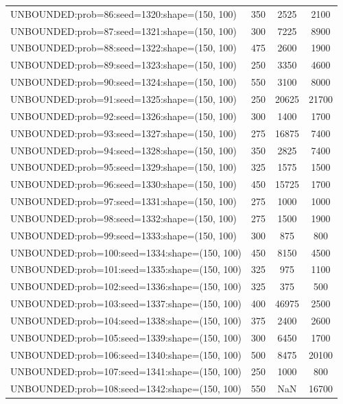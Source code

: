 \begin{longtable}{lccc}
UNBOUNDED:prob=86:seed=1320:shape=(150, 100)  &      350 &  2525 &   2100 \\
UNBOUNDED:prob=87:seed=1321:shape=(150, 100)  &      300 &  7225 &   8900 \\
UNBOUNDED:prob=88:seed=1322:shape=(150, 100)  &      475 &  2600 &   1900 \\
UNBOUNDED:prob=89:seed=1323:shape=(150, 100)  &      250 &  3350 &   4600 \\
UNBOUNDED:prob=90:seed=1324:shape=(150, 100)  &      550 &  3100 &   8000 \\
UNBOUNDED:prob=91:seed=1325:shape=(150, 100)  &      250 & 20625 &  21700 \\
UNBOUNDED:prob=92:seed=1326:shape=(150, 100)  &      300 &  1400 &   1700 \\
UNBOUNDED:prob=93:seed=1327:shape=(150, 100)  &      275 & 16875 &   7400 \\
UNBOUNDED:prob=94:seed=1328:shape=(150, 100)  &      350 &  2825 &   7400 \\
UNBOUNDED:prob=95:seed=1329:shape=(150, 100)  &      325 &  1575 &   1500 \\
UNBOUNDED:prob=96:seed=1330:shape=(150, 100)  &      450 & 15725 &   1700 \\
UNBOUNDED:prob=97:seed=1331:shape=(150, 100)  &      275 &  1000 &   1000 \\
UNBOUNDED:prob=98:seed=1332:shape=(150, 100)  &      275 &  1500 &   1900 \\
UNBOUNDED:prob=99:seed=1333:shape=(150, 100)  &      300 &   875 &    800 \\
UNBOUNDED:prob=100:seed=1334:shape=(150, 100) &      450 &  8150 &   4500 \\
UNBOUNDED:prob=101:seed=1335:shape=(150, 100) &      325 &   975 &   1100 \\
UNBOUNDED:prob=102:seed=1336:shape=(150, 100) &      325 &   375 &    500 \\
UNBOUNDED:prob=103:seed=1337:shape=(150, 100) &      400 & 46975 &   2500 \\
UNBOUNDED:prob=104:seed=1338:shape=(150, 100) &      375 &  2400 &   2600 \\
UNBOUNDED:prob=105:seed=1339:shape=(150, 100) &      300 &  6450 &   1700 \\
UNBOUNDED:prob=106:seed=1340:shape=(150, 100) &      500 &  8475 &  20100 \\
UNBOUNDED:prob=107:seed=1341:shape=(150, 100) &      250 &  1000 &    800 \\
UNBOUNDED:prob=108:seed=1342:shape=(150, 100) &      550 &   NaN &  16700 \\

\end{longtable}
